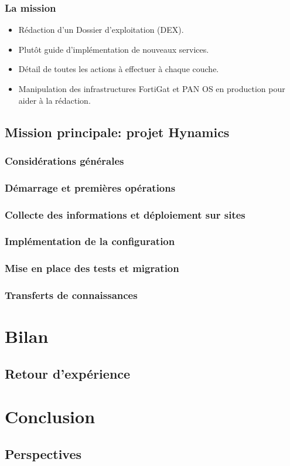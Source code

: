 \documentclass[french, a4paper]{beamer}
\begin{document}
\begin{frame}
    \frametitle{La mission}
    \begin{itemize}
        \item Rédaction d'un Dossier d'exploitation (DEX).
        \item Plutôt guide d'implémentation de nouveaux services.
        \item Détail de toutes les actions à effectuer à chaque couche.
        \item Manipulation des infrastructures FortiGat et PAN OS en production
            pour aider à la rédaction.
    \end{itemize}
\end{frame}

\subsection{Mission principale: projet Hynamics}
\subsubsection{Considérations générales}
\subsubsection{Démarrage et premières opérations}
\subsubsection{Collecte des informations et déploiement sur sites}
\subsubsection{Implémentation de la configuration}
\subsubsection{Mise en place des tests et migration}
\subsubsection{Transferts de connaissances}


\section{Bilan}
\subsection{Retour d'expérience}


\section{Conclusion}
\subsection{Perspectives}
\end{document}
